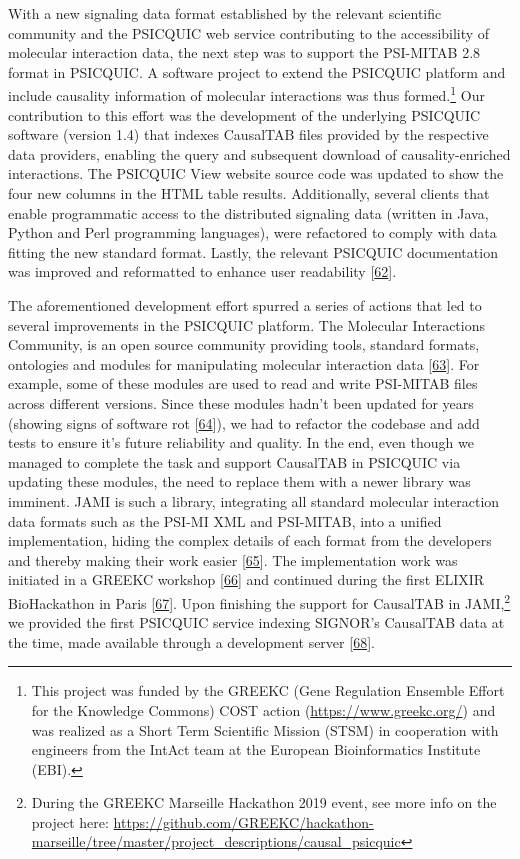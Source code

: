 \documentclass[
  12pt,
]{book}
\begin{document}
With a new signaling data format established by the relevant scientific community and the PSICQUIC web service contributing to the accessibility of molecular interaction data, the next step was to support the PSI-MITAB 2.8 format in PSICQUIC.
A software project to extend the PSICQUIC platform and include causality information of molecular interactions was thus formed.\footnote{This project was funded by the GREEKC (Gene Regulation Ensemble Effort for the Knowledge Commons) COST action (\url{https://www.greekc.org/}) and was realized as a Short Term Scientific Mission (STSM) in cooperation with engineers from the IntAct team at the European Bioinformatics Institute (EBI).}
Our contribution to this effort was the development of the underlying PSICQUIC software (version 1.4) that indexes CausalTAB files provided by the respective data providers, enabling the query and subsequent download of causality-enriched interactions.
The PSICQUIC View website source code was updated to show the four new columns in the HTML table results.
Additionally, several clients that enable programmatic access to the distributed signaling data (written in Java, Python and Perl programming languages), were refactored to comply with data fitting the new standard format.
Lastly, the relevant PSICQUIC documentation was improved and reformatted to enhance user readability {[}\protect\hyperlink{ref-mitab28-doc}{62}{]}.

The aforementioned development effort spurred a series of actions that led to several improvements in the PSICQUIC platform.
The Molecular Interactions Community, is an open source community providing tools, standard formats, ontologies and modules for manipulating molecular interaction data {[}\protect\hyperlink{ref-mi-github}{63}{]}.
For example, some of these modules are used to read and write PSI-MITAB files across different versions.
Since these modules hadn't been updated for years (showing signs of software rot {[}\protect\hyperlink{ref-wiki-soft-rot}{64}{]}), we had to refactor the codebase and add tests to ensure it's future reliability and quality.
In the end, even though we managed to complete the task and support CausalTAB in PSICQUIC via updating these modules, the need to replace them with a newer library was imminent.
JAMI is such a library, integrating all standard molecular interaction data formats such as the PSI-MI XML and PSI-MITAB, into a unified implementation, hiding the complex details of each format from the developers and thereby making their work easier {[}\protect\hyperlink{ref-Sivade2018a}{65}{]}.
The implementation work was initiated in a GREEKC workshop {[}\protect\hyperlink{ref-Hinxton2018}{66}{]} and continued during the first ELIXIR BioHackathon in Paris {[}\protect\hyperlink{ref-biohack2018}{67}{]}.
Upon finishing the support for CausalTAB in JAMI,\footnote{During the GREEKC Marseille Hackathon 2019 event, see more info on the project here: \url{https://github.com/GREEKC/hackathon-marseille/tree/master/project_descriptions/causal_psicquic}} we provided the first PSICQUIC service indexing SIGNOR's CausalTAB data at the time, made available through a development server {[}\protect\hyperlink{ref-psicquic-causalTAB-dataset}{68}{]}.
\end{document}
